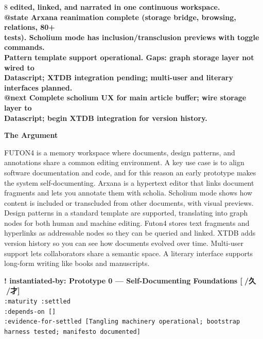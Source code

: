 \documentclass[landscape]{article}
\newenvironment{devmapsettled}{%
  \def\FrameCommand{\colorbox{devmapsettledbg}}%
  \setlength{\fboxsep}{2pt}%
  \MakeFramed{\advance\hsize-\width \FrameRestore}%
}{\endMakeFramed}
\begin{document}
\begin{paracol}{8}
\textbf{edited, linked, and narrated in one continuous workspace.}\\
\textbf{@state Arxana reanimation complete (storage bridge, browsing, relations, 80+}\\
\textbf{tests). Scholium mode has inclusion/transclusion previews with toggle commands.}\\
\textbf{Pattern template support operational. Gaps: graph storage layer not wired to}\\
\textbf{Datascript; XTDB integration pending; multi-user and literary interfaces planned.}\\
\textbf{@next Complete scholium UX for main article buffer; wire storage layer to}\\
\textbf{Datascript; begin XTDB integration for version history.}\\
\par
\textbf{The Argument}\par
\par
FUTON4 is a memory workspace where documents, design patterns, and annotations share a common editing environment. A key use case is to align software documentation and code, and for this reason an early prototype makes the system self-documenting. Arxana is a hypertext editor that links document fragments and lets you annotate them with scholia. Scholium mode shows how content is included or transcluded from other documents, with visual previews. Design patterns in a standard template are supported, translating into graph nodes for both human and machine editing. Futon4 stores text fragments and hyperlinks as addressable nodes so they can be queried and linked. XTDB adds version history so you can see how documents evolved over time. Multi-user support lets collaborators share a semantic space. A literary interface supports long-form writing like books and manuscripts.\\
\par
\par
\begin{devmapsettled}
\textbf{! instantiated-by: Prototype 0 — Self-Documenting Foundations [🌽/久 🙅/才]}\\
  \texttt{:\allowbreak{}maturity :\allowbreak{}settled}\\
  \texttt{:\allowbreak{}depends-\allowbreak{}on []}\\
  \texttt{:\allowbreak{}evidence-\allowbreak{}for-\allowbreak{}settled [Tangling machinery operational;\allowbreak{} bootstrap harness tested;\allowbreak{} manifesto documented]}\\

\end{devmapsettled}
\end{paracol}
\end{document}
